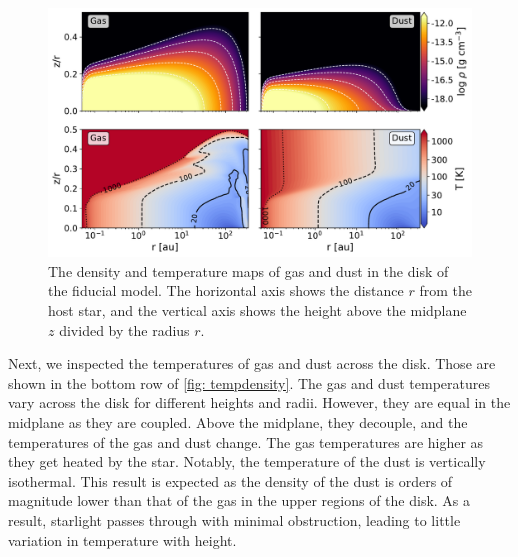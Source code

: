\documentclass[oneside, single, authoryear, semicolon, 12pt]{lion-msc}
\newcommand{\4}{$_4$}
\newcommand{\3}{$_3$}
\newcommand{\2}{$_2$}
\begin{document}
\begin{figure}[H]
    \centering
    \includegraphics[width=\linewidth]{Figures/DensityTemperature.pdf}
    \caption{The density and temperature maps of gas and dust in the disk of the fiducial model. The horizontal axis shows the distance $r$ from the host star, and the vertical axis shows the height above the midplane $z$ divided by the radius $r$.}
    \label{fig: tempdensity}
\end{figure}

Next, we inspected the temperatures of gas and dust across the disk. Those are shown in the bottom row of \autoref{fig: tempdensity}.  The gas and dust temperatures vary across the disk for different heights and radii. However, they are equal in the midplane as they are coupled. Above the midplane, they decouple, and the temperatures of the gas and dust change. The gas temperatures are higher as they get heated by the star. Notably, the temperature of the dust is vertically isothermal. This result is expected as the density of the dust is orders of magnitude lower than that of the gas in the upper regions of the disk.  As a result, starlight passes through with minimal obstruction, leading to little variation in temperature with height.
\end{document}

